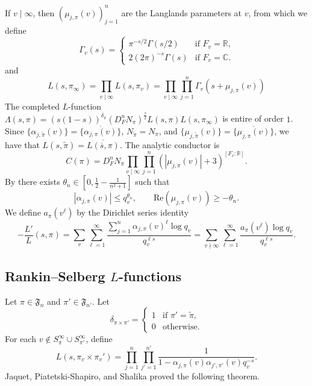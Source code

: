 \documentclass[11pt]{amsart}
\theoremstyle{remark}
\numberwithin{equation}{section}
\begin{document}
If $v\mid\infty$, then $(\mu_{j,\pi}(v))_{j=1}^n$ are the Langlands parameters at $v$, from which we define
\[
\Gamma_v(s)=\begin{cases}
	\pi^{-s/2}\Gamma(s/2)&\mbox{if $F_v=\mathbb{R}$,}\\
	2(2\pi)^{-s}\Gamma(s)&\mbox{if $F_v=\mathbb{C}$.}
	\end{cases}
	\]
and
\[
L(s,\pi_{\infty}) = \prod_{v\mid\infty}L(s,\pi_v) = \prod_{v\mid\infty}\prod_{j=1}^n \Gamma_v(s+\mu_{j,\pi}(v))
	\]
	The completed $L$-function $\Lambda(s,\pi)=(s(1-s))^{\delta_{\pi}}(D_F^n N_{\pi})^{\frac{s}{2}}L(s,\pi)L(s,\pi_{\infty})$ is entire of order $1$.  Since $\{\alpha_{j,\widetilde{\pi}}(v)\}=\{\overline{\alpha_{j,\pi}(v)}\}$, $N_{\widetilde{\pi}}=N_{\pi}$, and $\{\mu_{j,\widetilde{\pi}}(v)\}=\{\overline{\mu_{j,\pi}(v)}\}$, we have that $L(s,\widetilde{\pi})=\overline{L(\overline{s},\pi)}$.  The analytic conductor is
\begin{equation}
\label{eqn:AC_def}
C(\pi)=D_F^n N_{\pi} \prod_{v\mid\infty}\prod_{j=1}^n (|\mu_{j,\pi}(v)|+3)^{[F_v:\mathbb{R}]}.
\end{equation}
By \cite{LRS,MullerSpeh} there exists $\theta_n\in[0,\frac{1}{2}-\frac{1}{n^2+1}]$ such that
\begin{equation}
\label{eqn:Ramanujan1}
|\alpha_{j,\pi}(v)|\leq q_v^{\theta_{n}},\qquad \mathrm{Re}(\mu_{j,\pi}(v))\geq -\theta_{n}.
\end{equation}
We define $a_{\pi}(v^{\ell})$ by the Dirichlet series identity
\[
-\frac{L'}{L}(s,\pi)=\sum_{v}\sum_{\ell=1}^{\infty}\frac{\sum_{j=1}^n \alpha_{j,\pi}(v)^{\ell}\log q_v}{q_v^{\ell s}}=\sum_{v\nmid\infty}\sum_{\ell=1}^{\infty}\frac{a_{\pi}(v^{\ell})\log q_v}{q_v^{\ell s}}.
\]

\subsection{Rankin--Selberg $L$-functions}
\label{subsec:RS}

Let $\pi\in\mathfrak{F}_{n}$ and $\pi'\in\mathfrak{F}_{n'}$.  Let
\[
\delta_{\pi\times\pi'}=\begin{cases}
1&\mbox{if $\pi'=\widetilde{\pi}$,}\\
0&\mbox{otherwise.}
\end{cases}
\]
For each $v\notin S_{\pi}^{\infty}\cup S_{\pi'}^{\infty}$, define
\[
L(s,\pi_{v}\times\pi_{v}')=\prod_{j=1}^n \prod_{j'=1}^{n'}\frac{1}{1-\alpha_{j,\pi}(v)\alpha_{j',\pi'}(v)q_v^{-s}}.
\]
Jaquet, Piatetski-Shapiro, and Shalika proved the following theorem.
\end{document}
